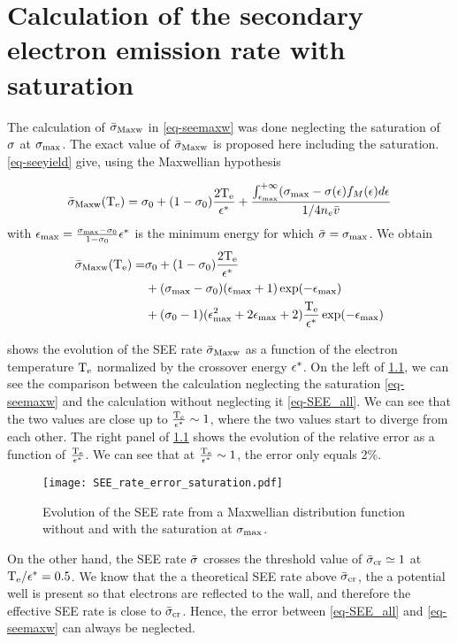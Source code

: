 
\chapter{Calculation of the secondary electron emission rate with saturation}
\label{an-SEE_exact}

The calculation of $ \bar{\sigma }_{\rm Maxw}$ in \cref{eq-seemaxw} was done neglecting the saturation of $\sigma $ at $\sigma_{\rm max}$.
The exact value of  $ \bar{\sigma }_{\rm Maxw}$ is proposed here including the saturation.
\cref{eq-seeyield} give, using the Maxwellian hypothesis

\begin{equation} \label{eq-SEE_sat}
   \bar{\sigma }_{\rm Maxw}(\mathrm{T_e}) = \sigma _0 + (1 - \sigma _0) \frac{2 \mathrm{T_e}}{\epsilon^{*}} + \frac{\int_{\epsilon_{\max}}^{+ \infty} (\sigma _{\rm max}  - \sigma (\epsilon) f_M(\epsilon) d\epsilon}{1/4 n_e \bar{v}}
\end{equation}
with  $\epsilon_{\max}= \frac{\sigma _{\rm max}  - \sigma _0}{1 - \sigma _0} \epsilon^{*} $ is the minimum energy for which $ \bar{\sigma } = \sigma _{\rm max} $.
We obtain
\begin{align}  \label{eq-SEE_all}
   \bar{\sigma }_{\rm Maxw}(\mathrm{T_e}) =& \sigma _0 + (1 - \sigma _0) \frac{2 \mathrm{T_e}}{\epsilon^{*}} \\
  & + (\sigma _{\rm max}  - \sigma _0) (\epsilon_{\max} + 1 )\exp(- \epsilon_{\max}) \\
  & + (\sigma _0-1) (\epsilon_{\max}^2 +2\epsilon_{\max} + 2)\frac{\mathrm{T_e}}{\epsilon^{*}} \exp(-\epsilon_{\max}) 
\end{align}

 shows the evolution of the \ac{SEE} rate $ \bar{\sigma }_{\rm Maxw}$ as a function of the electron temperature $\mathrm{T_e}$ normalized by the crossover energy $\epsilon^{*}$.
On the left of \cref{fig-see_error}, we can see the comparison between the calculation neglecting the saturation  \cref{eq-seemaxw} and the calculation without neglecting it  \cref{eq-SEE_all}.
We can see that the two values are close up to $\frac{\mathrm{T_e}}{\epsilon^{*}}\sim 1$, where the two values start to diverge from each other.
The right panel of \cref{fig-see_error} shows the evolution of the relative error as a function of $\frac{\mathrm{T_e}}{\epsilon^{*}}$.
We can see that at $\frac{\mathrm{T_e}}{\epsilon^{*}}\sim 1$, the error only equals 2\%.
\begin{figure}[hbtp]
  \centering
  \texttt{[image: SEE\_rate\_error\_saturation.pdf]}
  \caption{Evolution of the \acs{SEE} rate from a Maxwellian distribution function without and with the saturation at $\sigma_{\rm max}$.}
  \label{fig-see_error}
\end{figure}

On the other hand, the \ac{SEE} rate $ \bar{\sigma }$ crosses the threshold value of $ \bar{\sigma }_{\rm cr} \simeq 1$ at $\mathrm{T_e}/\epsilon^{*} = 0.5$.
We know that the a theoretical \ac{SEE} rate above $ \bar{\sigma }_{\rm cr}$, the a potential well is present so that electrons are reflected to the wall, and therefore the effective \ac{SEE} rate is close to $ \bar{\sigma }_{\rm cr}$.
Hence, the error between  \cref{eq-SEE_all} and \cref{eq-seemaxw} can always be neglected.
